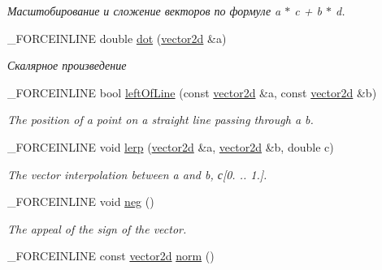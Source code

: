 \begin{DoxyCompactItemize}
\begin{DoxyCompactList}\small\item\em Масштобирование и сложение векторов по формуле a $\ast$ c + b $\ast$ d. \end{DoxyCompactList}\item 
\hypertarget{classbt_1_1vector2d_a38e9ebf2472180824d384cd983f2bc1f}{\-\_\-\-F\-O\-R\-C\-E\-I\-N\-L\-I\-N\-E double \hyperlink{classbt_1_1vector2d_a38e9ebf2472180824d384cd983f2bc1f}{dot} (\hyperlink{classbt_1_1vector2d}{vector2d} \&a)}\label{classbt_1_1vector2d_a38e9ebf2472180824d384cd983f2bc1f}

\begin{DoxyCompactList}\small\item\em Скалярное произведение \end{DoxyCompactList}\item 
\hypertarget{classbt_1_1vector2d_ae502f48348c8c040df6aa648fe19e3f7}{\-\_\-\-F\-O\-R\-C\-E\-I\-N\-L\-I\-N\-E bool \hyperlink{classbt_1_1vector2d_ae502f48348c8c040df6aa648fe19e3f7}{left\-Of\-Line} (const \hyperlink{classbt_1_1vector2d}{vector2d} \&a, const \hyperlink{classbt_1_1vector2d}{vector2d} \&b)}\label{classbt_1_1vector2d_ae502f48348c8c040df6aa648fe19e3f7}

\begin{DoxyCompactList}\small\item\em The position of a point on a straight line passing through a b. \end{DoxyCompactList}\item 
\hypertarget{classbt_1_1vector2d_acff70b8ff20a9a16b9748421c9943f89}{\-\_\-\-F\-O\-R\-C\-E\-I\-N\-L\-I\-N\-E void \hyperlink{classbt_1_1vector2d_acff70b8ff20a9a16b9748421c9943f89}{lerp} (\hyperlink{classbt_1_1vector2d}{vector2d} \&a, \hyperlink{classbt_1_1vector2d}{vector2d} \&b, double c)}\label{classbt_1_1vector2d_acff70b8ff20a9a16b9748421c9943f89}

\begin{DoxyCompactList}\small\item\em The vector interpolation between a and b, с\mbox{[}0. .. 1.\mbox{]}. \end{DoxyCompactList}\item 
\hypertarget{classbt_1_1vector2d_af8ccb56bf29bd4131ef246e7755a5930}{\-\_\-\-F\-O\-R\-C\-E\-I\-N\-L\-I\-N\-E void \hyperlink{classbt_1_1vector2d_af8ccb56bf29bd4131ef246e7755a5930}{neg} ()}\label{classbt_1_1vector2d_af8ccb56bf29bd4131ef246e7755a5930}

\begin{DoxyCompactList}\small\item\em The appeal of the sign of the vector. \end{DoxyCompactList}\item 
\hypertarget{classbt_1_1vector2d_aaa0317a132e5dd03f582dd628e0c1061}{\-\_\-\-F\-O\-R\-C\-E\-I\-N\-L\-I\-N\-E const \hyperlink{classbt_1_1vector2d}{vector2d} \hyperlink{classbt_1_1vector2d_aaa0317a132e5dd03f582dd628e0c1061}{norm} ()}\label{classbt_1_1vector2d_aaa0317a132e5dd03f582dd628e0c1061}


\end{DoxyCompactItemize}

